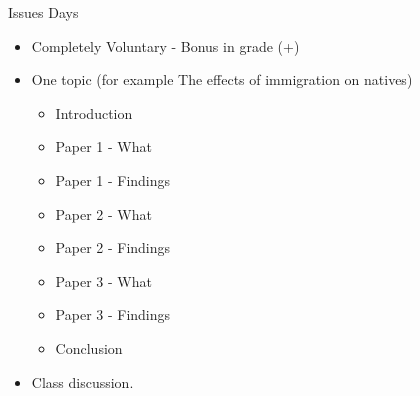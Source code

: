 \documentclass{beamer}
\newcommand{\1}{\mathbb{1}}
\begin{document}
\begin{frame}{Issues Days}
\begin{itemize}
\item Completely Voluntary - Bonus in grade (+)
\item One topic (for example The effects of immigration on natives)
\begin{itemize}
\item Introduction 
\item Paper 1 - What
\item Paper 1 - Findings
\item Paper 2 - What 
\item Paper 2 - Findings
\item Paper 3 - What
\item Paper 3 - Findings
\item Conclusion
\end{itemize}
\item Class discussion.
\end{itemize}
\end{frame}
\end{document}
